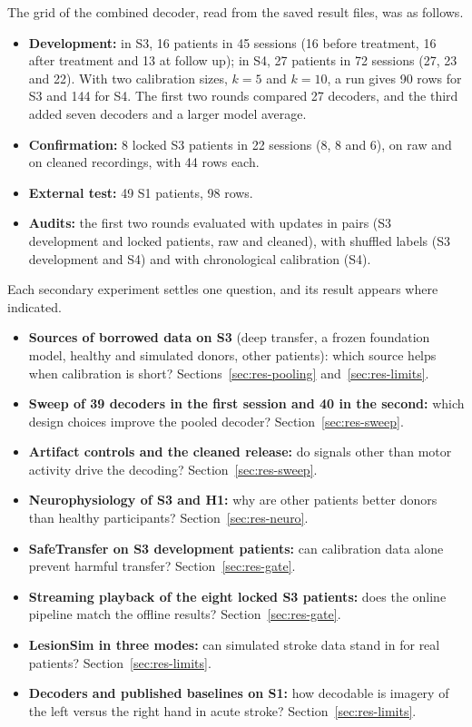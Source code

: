 \documentclass[pdflatex,sn-mathphys-num]{sn-jnl}
\begin{document}
The grid of the combined decoder, read from the saved result files, was as follows.
\begin{itemize}
\item \textbf{Development:} in S3, 16 patients in 45 sessions (16 before treatment, 16 after treatment and 13 at follow up); in S4, 27 patients in 72 sessions (27, 23 and 22). With two calibration sizes, $k = 5$ and $k = 10$, a run gives 90 rows for S3 and 144 for S4. The first two rounds compared 27 decoders, and the third added seven decoders and a larger model average.
\item \textbf{Confirmation:} 8 locked S3 patients in 22 sessions (8, 8 and 6), on raw and on cleaned recordings, with 44 rows each.
\item \textbf{External test:} 49 S1 patients, 98 rows.
\item \textbf{Audits:} the first two rounds evaluated with updates in pairs (S3 development and locked patients, raw and cleaned), with shuffled labels (S3 development and S4) and with chronological calibration (S4).
\end{itemize}
Each secondary experiment settles one question, and its result appears where indicated.
\begin{itemize}
\item \textbf{Sources of borrowed data on S3} (deep transfer, a frozen foundation model, healthy and simulated donors, other patients): which source helps when calibration is short? Sections~\ref{sec:res-pooling} and~\ref{sec:res-limits}.
\item \textbf{Sweep of 39 decoders in the first session and 40 in the second:} which design choices improve the pooled decoder? Section~\ref{sec:res-sweep}.
\item \textbf{Artifact controls and the cleaned release:} do signals other than motor activity drive the decoding? Section~\ref{sec:res-sweep}.
\item \textbf{Neurophysiology of S3 and H1:} why are other patients better donors than healthy participants? Section~\ref{sec:res-neuro}.
\item \textbf{SafeTransfer on S3 development patients:} can calibration data alone prevent harmful transfer? Section~\ref{sec:res-gate}.
\item \textbf{Streaming playback of the eight locked S3 patients:} does the online pipeline match the offline results? Section~\ref{sec:res-gate}.
\item \textbf{LesionSim in three modes:} can simulated stroke data stand in for real patients? Section~\ref{sec:res-limits}.
\item \textbf{Decoders and published baselines on S1:} how decodable is imagery of the left versus the right hand in acute stroke? Section~\ref{sec:res-limits}.
\end{itemize}
\end{document}
